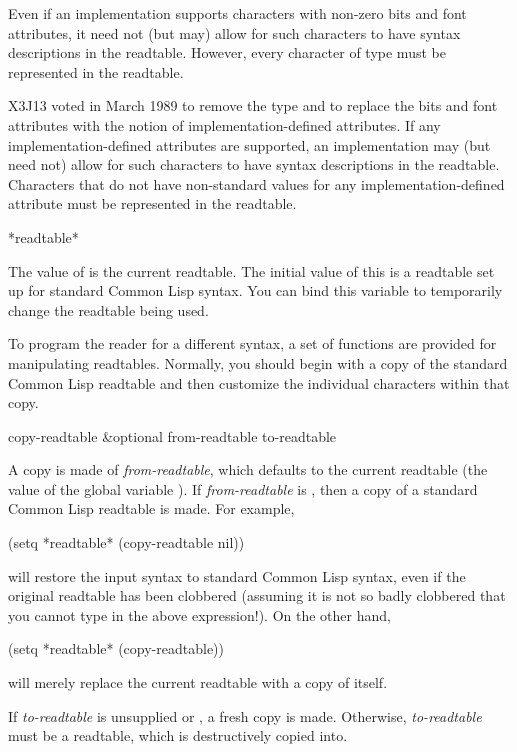 \begin{obsolete}
Even if an implementation supports characters with non-zero bits and font attributes,
it need not (but may) allow for such characters to have syntax
descriptions in the readtable.  However, every character of type
 must be represented in the readtable.
\end{obsolete}

\begin{newer}
X3J13 voted in March 1989 
to remove the type  and to replace the bits and font attributes
with the notion of implementation-defined attributes.
If any implementation-defined attributes are supported, an implementation
may (but need not) allow for such characters to have syntax
descriptions in the readtable.  Characters that do not have non-standard values
for any implementation-defined attribute must be represented in the readtable.
\end{newer}

\begin{defun}[Variable]
*readtable*

The value of  is the current readtable.  The initial
value of this is a readtable set up for standard Common Lisp syntax.
You can bind this variable to temporarily change the readtable being used.
\end{defun}

To program the reader for a different syntax, a set of functions are
provided for manipulating readtables.  Normally, you should begin
with a copy of the standard Common Lisp readtable and then customize
the individual characters within that copy.

\begin{defun}[Function]
copy-readtable &optional from-readtable to-readtable

A copy is made of \emph{from-readtable}, which defaults to the current readtable
(the value of the global variable ).  If \emph{from-readtable}
is {\false}, then a copy of a standard Common Lisp readtable is made.
For example,
\begin{lisp}
(setq *readtable* (copy-readtable nil))
\end{lisp}
will restore the input syntax to standard Common Lisp syntax, even if
the original readtable has been clobbered (assuming it is not so
badly clobbered that you cannot type in the above expression!).
On the other hand,
\begin{lisp}
(setq *readtable* (copy-readtable))
\end{lisp}
will merely replace the current readtable with a copy of itself.

If \emph{to-readtable} is unsupplied or {\false}, a fresh copy is made.  Otherwise,
\emph{to-readtable} must be a readtable, which is destructively copied into.
\end{defun}

